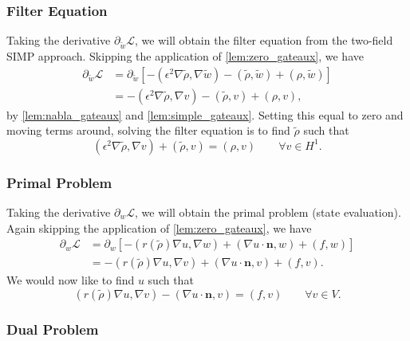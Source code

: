 \subsubsection{Filter Equation}

Taking the derivative $\partial_{\tilde{w}} \mathcal{L}$, we will obtain the filter equation from the 
two-field SIMP approach. Skipping the
application of \autoref{lem:zero_gateaux}, we have
\begin{align*}
    \partial_{\tilde{w}} \mathcal{L} &= \partial_{\tilde{w}} \left[ -(\epsilon^2 \nabla \tilde{\rho}, \nabla \tilde{w}) - (\tilde{\rho}, \tilde{w}) + (\rho, \tilde{w})\right] \\
        &= -(\epsilon^2 \nabla \tilde{\rho}, \nabla v) - (\tilde{\rho}, v) + (\rho, v),
\end{align*}
by \autoref{lem:nabla_gateaux} and \autoref{lem:simple_gateaux}.
Setting this equal to zero and moving terms around, solving the filter equation is to find $\tilde{\rho}$ such that
\begin{equation*}
    (\epsilon^2 \nabla \tilde{\rho}, \nabla v) + (\tilde{\rho}, v) = (\rho, v) \qquad \forall v \in H^1.
\end{equation*}

\subsubsection{Primal Problem}

Taking the derivative $\partial_{w} \mathcal{L}$, we will obtain the primal problem (state evaluation). Again skipping the application
of \autoref{lem:zero_gateaux}, we have
\begin{align*}
    \partial_{w} \mathcal{L} &= \partial_{w} \left[ -(r(\tilde{\rho}) \nabla u, \nabla w) + (\nabla u \cdot \mathbf{n}, w) + (f, w) \right]\\
        &= -(r(\tilde{\rho}) \nabla u, \nabla v) + (\nabla u \cdot \mathbf{n}, v) + (f,v).
\end{align*}
We would now like to find $u$ such that
\begin{equation*}
    (r(\tilde{\rho}) \nabla u, \nabla v) - (\nabla u \cdot \mathbf{n}, v) = (f,v) \qquad \forall v \in V.
\end{equation*}

\subsubsection{Dual Problem}


